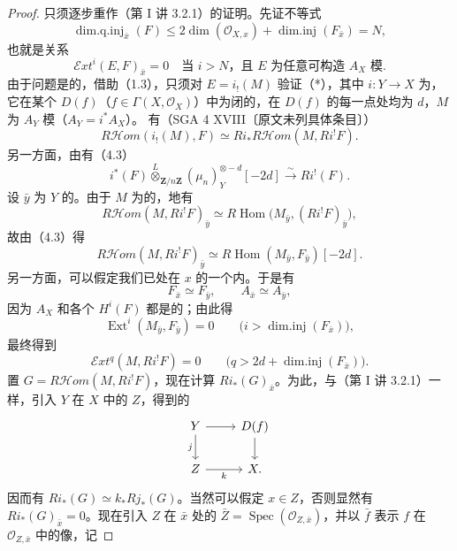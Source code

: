 \begin{proof}
只须逐步重作（第 I 讲 3.2.1）的证明。先证不等式
\[
\operatorname{dim.q.inj}_{\bar x}(F)
\leq2\dim(\mathcal O_{X,x})+\operatorname{dim.inj}(F_{\bar x})=N,
\]
也就是关系
\[
\mathcal Ext^i(E,F)_{\bar x}=0
\quad\text{当 }i>N\text{，且 }E\text{ 为任意可构造 }A_X\text{ 模}.
\tag{*}
\]
由于问题是的，借助（1.3），只须对 $E=i_!(M)$ 验证（*），其中 $i:Y\to X$ 为，它在某个 $D(f)$（$f\in\Gamma(X,\mathcal O_X)$）中为闭的，在 $D(f)$ 的每一点处均为 $d$，$M$ 为 $A_Y$ 模（$A_Y=i^*A_X$）。
有（SGA 4 XVIII\textup{〔原文未列具体条目〕}）
\[
R\mathcal Hom(i_!(M),F)\simeq Ri_*R\mathcal Hom(M,Ri^!F).
\]
另一方面，由有（4.3）
\[
i^*(F)\mathbin{\mathop\otimes\limits^L}_{\mathbf Z/n\mathbf Z}(\mu_n)_Y^{\otimes-d}[-2d]
\xrightarrow{\sim}Ri^!(F).
\]
设 $\bar y$ 为 $Y$ 的。由于 $M$ 为的，地有
\[
R\mathcal Hom(M,Ri^!F)_{\bar y}
\simeq R\operatorname{Hom}\bigl(M_{\bar y},(Ri^!F)_{\bar y}\bigr),
\]
故由（4.3）得
\[
R\mathcal Hom(M,Ri^!F)_{\bar y}
\simeq R\operatorname{Hom}(M_{\bar y},F_{\bar y})[-2d].
\]
另一方面，可以假定我们已处在 $x$ 的一个内。于是有
\[
F_{\bar x}\simeq F_{\bar y},\qquad A_{\bar x}\simeq A_{\bar y},
\]
因为 $A_X$ 和各个 $H^i(F)$ 都是的；由此得
\[
\operatorname{Ext}^i(M_{\bar y},F_{\bar y})=0
\qquad\bigl(i>\operatorname{dim.inj}(F_{\bar x})\bigr),
\]
最终得到
\[
\mathcal Ext^q(M,Ri^!F)=0
\qquad\bigl(q>2d+\operatorname{dim.inj}(F_{\bar x})\bigr).
\]
置 $G=R\mathcal Hom(M,Ri^!F)$，现在计算 $Ri_*(G)_{\bar x}$。为此，与（第 I 讲 3.2.1）一样，引入 $Y$ 在 $X$ 中的 $Z$，得到的
\[
\begin{tikzcd}
Y\arrow[r]\arrow[d,"j"']&D(f)\arrow[d]\\
Z\arrow[r,"k"']&X.
\end{tikzcd}
\]
因而有 $Ri_*(G)\simeq k_*Rj_*(G)$。当然可以假定 $x\in Z$，否则显然有 $Ri_*(G)_{\bar x}=0$。现在引入 $Z$ 在 $\bar x$ 处的
$\bar Z=\operatorname{Spec}(\mathcal O_{Z,\bar x})$，并以 $\bar f$ 表示 $f$ 在 $\mathcal O_{Z,\bar x}$ 中的像，记

\end{proof}
